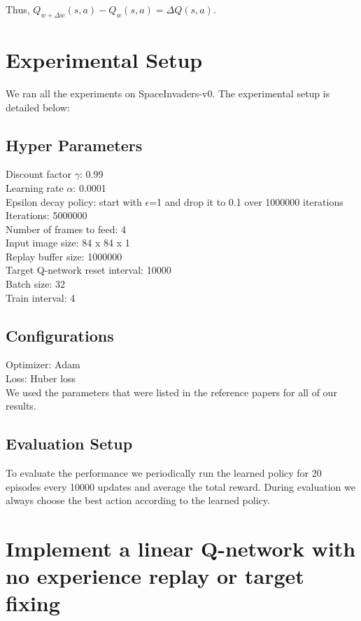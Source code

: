 \documentclass{article}
\begin{document}
Thus, $Q_{w+\Delta w}(s,a) - Q_{w}(s,a) = \Delta Q(s,a)$. 

\section*{Experimental Setup}
We ran all the experiments on SpaceInvaders-v0. The experimental setup is detailed below:

\subsection*{Hyper Parameters}
Discount factor $\gamma$: 0.99\\
Learning rate $\alpha$: 0.0001\\
Epsilon decay policy: start with $\epsilon$=1 and drop it to 0.1 over 1000000 iterations\\
Iterations: 5000000\\
Number of frames to feed: 4\\
Input image size: 84 x 84 x 1\\
Replay buffer size: 1000000\\
Target Q-network reset interval: 10000\\
Batch size: 32\\
Train interval: 4

\subsection*{Configurations}
Optimizer: Adam\\
Loss: Huber loss\\

We used the parameters that were listed in the reference papers for all of our results.

\subsection*{Evaluation Setup}
To evaluate the performance we periodically run the learned policy for 20 episodes every 10000 updates and average the total reward. During evaluation we always choose the best action according to the learned policy.





\section*{Implement a linear Q-network with no experience replay or target fixing}
\end{document}
